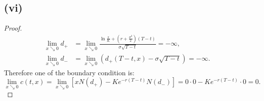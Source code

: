 \documentclass[final,3p,authoryear]{elsarticle}
\begin{document}
	\subsection{(vi)}
		\begin{proof}
			\begin{align}
				\lim\limits_{x \searrow 0} d_+ &= \lim\limits_{x \searrow 0} \frac{\ln\frac{x}{K}+\left(r+\frac{\sigma^2}{2}\right)\left(T-t\right)}{\sigma\sqrt{T-t}} = -\infty
				,
				\\
				\lim\limits_{x \searrow 0} d_- &= \lim\limits_{x \searrow 0} \left(d_+(T-t,x) - \sigma\sqrt{T-t}\right) = -\infty
				.
			\end{align}
			Therefore one of the boundary condition is:
			\begin{equation}
				\lim\limits_{x \searrow 0} c(t,x) = \lim\limits_{x \searrow 0} \left[ x N(d_+) - K e^{-r\left(T-t\right)} N(d_-) \right] = 0 \cdot 0 - K e^{-r\left(T-t\right)} \cdot 0 = 0
				.
			\end{equation}
		\end{proof}
		
\end{document}
